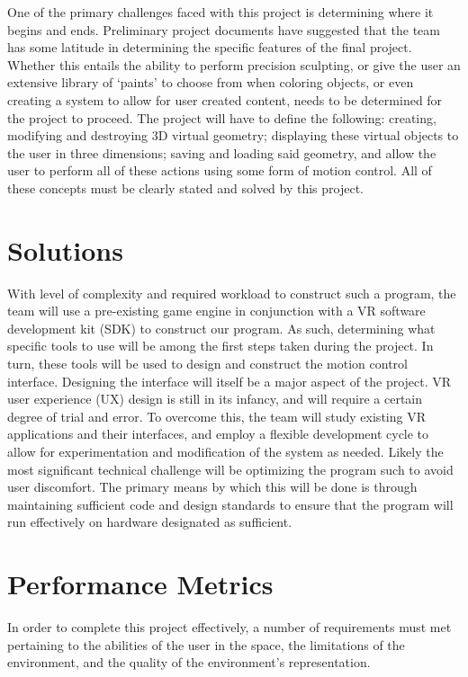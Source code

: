 \documentclass[onecolumn, draftclsnofoot,10pt, compsoc]{IEEEtran}
\begin{document}
One of the primary challenges faced with this project is determining where it begins and ends.
Preliminary project documents have suggested that the team has some latitude in determining the specific features of the final project.
Whether this entails the ability to perform precision sculpting, or give the user an extensive library of ‘paints’ to choose from when coloring objects, or even creating a system to allow for user created content, needs to be determined for the project to proceed.
The project will have to define the following: creating, modifying and destroying 3D virtual geometry; displaying these virtual objects to the user in three dimensions; saving and loading said geometry, and allow the user to perform all of these actions using some form of motion control. All of these concepts must be clearly stated and solved by this project.

\section{Solutions}
With level of complexity and required workload to construct such a program, the team will use a pre-existing game engine in conjunction with a VR software development kit (SDK) to construct our program.
As such, determining what specific tools to use will be among the first steps taken during the project.
In turn, these tools will be used to design and construct the motion control interface.
Designing the interface will itself be a major aspect of the project.
VR user experience (UX) design is still in its infancy, and will require a certain degree of trial and error.
To overcome this, the team will study existing VR applications and their interfaces, and employ a flexible development cycle to allow for experimentation and modification of the system as needed.
Likely the most significant technical challenge will be optimizing the program such to avoid user discomfort.
The primary means by which this will be done is through maintaining sufficient code and design standards to ensure that the program will run effectively on hardware designated as sufficient. 

\section{Performance Metrics}
In order to complete this project effectively, a number of requirements must met pertaining to the abilities of the user in the space, the limitations of the environment, and the quality of the environment’s representation.
\end{document}
